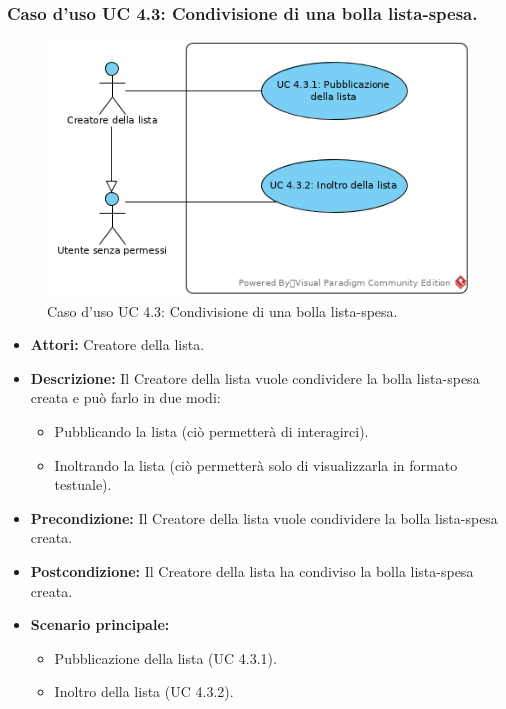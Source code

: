 \newpage
\subsubsection{Caso d'uso UC 4.3: Condivisione di una bolla lista-spesa.}
\label{Caso d'uso UC 4.3: Condivisione di una bolla lista-spesa.}
\begin{figure}[ht]
	\centering
	\includegraphics[scale=0.60]{Usecases/img/UC4.3.png}
	\caption{Caso d'uso UC 4.3: Condivisione di una bolla lista-spesa.}
\end{figure}

\FloatBarrier
\begin{itemize}
\item \textbf{Attori:} Creatore della lista.
\item \textbf{Descrizione:} Il Creatore della lista vuole condividere la bolla lista-spesa creata e può farlo in due modi:
\begin{itemize}
\item{Pubblicando la lista (ciò permetterà di interagirci).}
\item{Inoltrando la lista (ciò permetterà solo di visualizzarla in formato testuale).}
\end{itemize}
\item \textbf{Precondizione:} Il Creatore della lista vuole condividere la bolla lista-spesa creata. 
\item \textbf{Postcondizione:} Il Creatore della lista ha condiviso la bolla lista-spesa creata.
\item \textbf{Scenario principale:}
	\begin{itemize}
	\item{Pubblicazione della lista (UC 4.3.1).}
	\item{Inoltro della lista (UC 4.3.2).}
	\end{itemize}
\end{itemize}